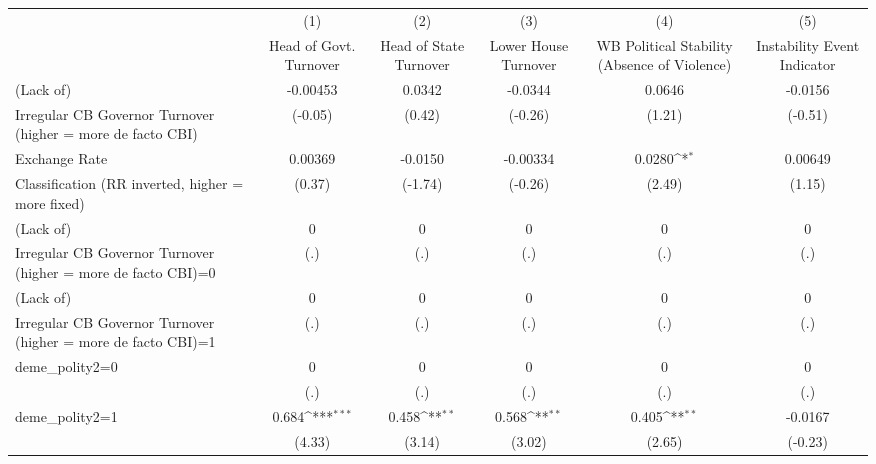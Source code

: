 {
\def\sym#1{\ifmmode^{#1}\else\(^{#1}\)\fi}
\begin{tabular}{l*{5}{c}}
\toprule
                &\multicolumn{1}{c}{(1)}&\multicolumn{1}{c}{(2)}&\multicolumn{1}{c}{(3)}&\multicolumn{1}{c}{(4)}&\multicolumn{1}{c}{(5)}\\
                &\multicolumn{1}{c}{Head of Govt. Turnover}&\multicolumn{1}{c}{Head of State Turnover}&\multicolumn{1}{c}{Lower House Turnover}&\multicolumn{1}{c}{WB Political Stability (Absence of Violence)}&\multicolumn{1}{c}{Instability Event Indicator}\\
\midrule
(Lack of)       & -0.00453         &   0.0342         &  -0.0344         &   0.0646         &  -0.0156         \\
Irregular CB Governor Turnover (higher = more de facto CBI)&  (-0.05)         &   (0.42)         &  (-0.26)         &   (1.21)         &  (-0.51)         \\
\addlinespace
Exchange Rate   &  0.00369         &  -0.0150         & -0.00334         &   0.0280\sym{*}  &  0.00649         \\
Classification (RR inverted, higher = more fixed)&   (0.37)         &  (-1.74)         &  (-0.26)         &   (2.49)         &   (1.15)         \\
\addlinespace
(Lack of)       &        0         &        0         &        0         &        0         &        0         \\
Irregular CB Governor Turnover (higher = more de facto CBI)=0&      (.)         &      (.)         &      (.)         &      (.)         &      (.)         \\
\addlinespace
(Lack of)       &        0         &        0         &        0         &        0         &        0         \\
Irregular CB Governor Turnover (higher = more de facto CBI)=1&      (.)         &      (.)         &      (.)         &      (.)         &      (.)         \\
\addlinespace
deme\_polity2=0  &        0         &        0         &        0         &        0         &        0         \\
                &      (.)         &      (.)         &      (.)         &      (.)         &      (.)         \\
\addlinespace
deme\_polity2=1  &    0.684\sym{***}&    0.458\sym{**} &    0.568\sym{**} &    0.405\sym{**} &  -0.0167         \\
                &   (4.33)         &   (3.14)         &   (3.02)         &   (2.65)         &  (-0.23)         \\

\end{tabular}}
